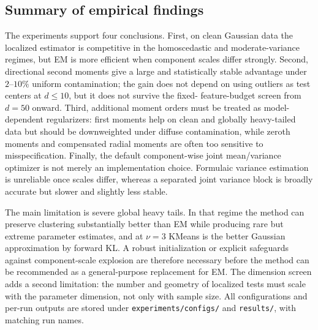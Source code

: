 \documentclass[11pt,a4paper]{article}
\begin{document}
\FloatBarrier
\clearpage
\subsection{Summary of empirical findings}
\label{sec:exp_summary}

The experiments support four conclusions.  First, on clean Gaussian data the
localized estimator is competitive in the homoscedastic and moderate-variance
regimes, but EM is more efficient when component scales differ strongly.
Second, directional second moments give a large and statistically stable
advantage under $2$--$10\%$ uniform contamination; the gain does not depend on
using outliers as test centers at $d\leq10$, but it does not survive the fixed-
feature-budget screen from $d=50$ onward.  Third, additional moment orders must be
treated as model-dependent regularizers: first moments help on clean and
globally heavy-tailed data but should be downweighted under diffuse
contamination, while zeroth moments and compensated radial moments are often
too sensitive to misspecification.  Finally, the default component-wise joint
mean/variance optimizer is not merely an implementation choice.  Formulaic
variance estimation is unreliable once scales differ, whereas a separated
joint variance block is broadly accurate but slower and slightly less stable.

The main limitation is severe global heavy tails.  In that regime the method
can preserve clustering substantially better than EM while producing rare
but extreme parameter estimates, and at $\nu=3$ KMeans is the better Gaussian
approximation by forward KL.  A robust initialization or explicit safeguards
against component-scale explosion are therefore necessary before the method
can be recommended as a general-purpose replacement for EM.  The dimension
screen adds a second limitation: the number and geometry of localized tests
must scale with the parameter dimension, not only with sample size.  All
configurations and per-run outputs are stored under
\texttt{experiments/configs/} and \texttt{results/}, with matching run names.
\end{document}
